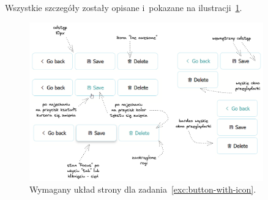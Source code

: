 \documentclass[12pt]{article}
\begin{document}
\begin{enumerate}
            Wszystkie szczegóły zostały opisane i~pokazane na ilustracji~\ref{fig:button-with-icon}.

            \begin{figure}[p]
                \centering
                \includegraphics[width=0.9\textwidth]{lista-1-3}
                \caption{Wymagany układ strony dla zadania~\ref{exc:button-with-icon}.}
                \label{fig:button-with-icon}
            \end{figure}
    \end{enumerate}
\end{document}
